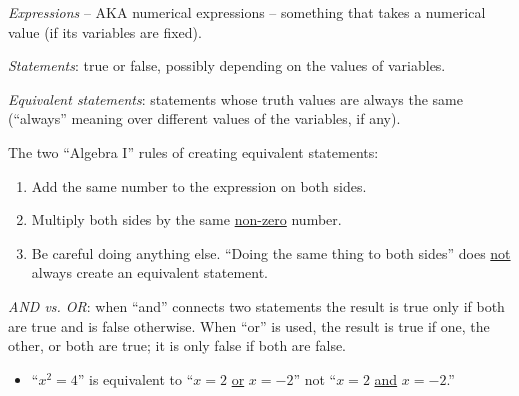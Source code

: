 \documentclass{amsbook}
\numberwithin{section}{chapter}
\numberwithin{equation}{chapter}
\newcommand{\qi}[1]{\begin{itemize}\item #1 \end{itemize}}
\newcommand{\Q}{\mathbb{Q}}
\newcommand{\Z}{\mathbb{Z}}
\newcommand{\R}{\mathbb{R}}
\newcommand{\N}{\mathbb{N}}
\begin{document}
\medskip
{}

\textit{Expressions} -- AKA numerical expressions -- something that takes a numerical value (if its variables are fixed).

\textit{Statements}: true or false, possibly depending on the values of variables.

\textit{Equivalent statements}: statements whose truth values are always the same (``always'' meaning over different values of the variables, if any).

The two ``Algebra I'' rules of creating equivalent statements:
\begin{enumerate}
	\item Add the same number to the expression on both sides.
	\item Multiply both sides by the same \underline{non-zero} number.
	\item Be careful doing anything else. ``Doing the same thing to both sides'' does \underline{not} always create an equivalent statement.
\end{enumerate}

\textit{AND vs. OR}: when ``and'' connects two statements the result is true only if both are true and is false otherwise. When ``or'' is used, the result is true if one, the other, or both are true; it is only false if both are false.
\qi{``$x^2=4$'' is equivalent to ``$x=2$ \underline{or} $x=-2$'' not ``$x=2$ \underline{and} $x=-2$.''}
\end{document}
